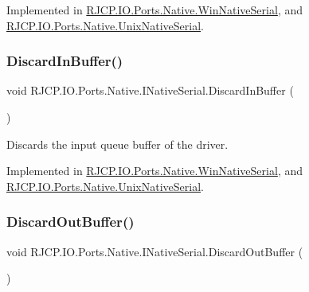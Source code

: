 Implemented in \mbox{\hyperlink{class_r_j_c_p_1_1_i_o_1_1_ports_1_1_native_1_1_win_native_serial_ad36215a4957349cba6078c7196dc6db3}{R\+J\+C\+P.\+I\+O.\+Ports.\+Native.\+Win\+Native\+Serial}}, and \mbox{\hyperlink{class_r_j_c_p_1_1_i_o_1_1_ports_1_1_native_1_1_unix_native_serial_ae5f713e425dbe5c51cbabd4ed2367869}{R\+J\+C\+P.\+I\+O.\+Ports.\+Native.\+Unix\+Native\+Serial}}.

\mbox{\label{interface_r_j_c_p_1_1_i_o_1_1_ports_1_1_native_1_1_i_native_serial_a686c3cba30f5d5f706d7d3260c4feea5}} 
\subsubsection{\texorpdfstring{DiscardInBuffer()}{DiscardInBuffer()}}
{\footnotesize\ttfamily void R\+J\+C\+P.\+I\+O.\+Ports.\+Native.\+I\+Native\+Serial.\+Discard\+In\+Buffer (\begin{DoxyParamCaption}{ }\end{DoxyParamCaption})}



Discards the input queue buffer of the driver. 



Implemented in \mbox{\hyperlink{class_r_j_c_p_1_1_i_o_1_1_ports_1_1_native_1_1_win_native_serial_a1649b6bcb63367419fc2c1701e9cab94}{R\+J\+C\+P.\+I\+O.\+Ports.\+Native.\+Win\+Native\+Serial}}, and \mbox{\hyperlink{class_r_j_c_p_1_1_i_o_1_1_ports_1_1_native_1_1_unix_native_serial_ad628c35942e258da066b0c488c3cc4ef}{R\+J\+C\+P.\+I\+O.\+Ports.\+Native.\+Unix\+Native\+Serial}}.

\mbox{\label{interface_r_j_c_p_1_1_i_o_1_1_ports_1_1_native_1_1_i_native_serial_a1faafeb15779e3f998fd76601332ec8f}} 
\subsubsection{\texorpdfstring{DiscardOutBuffer()}{DiscardOutBuffer()}}
{\footnotesize\ttfamily void R\+J\+C\+P.\+I\+O.\+Ports.\+Native.\+I\+Native\+Serial.\+Discard\+Out\+Buffer (\begin{DoxyParamCaption}{ }\end{DoxyParamCaption})}



